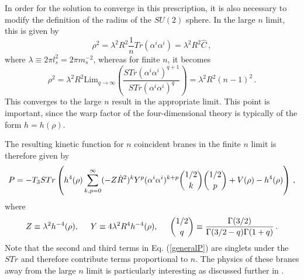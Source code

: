 In order for the solution to converge in this prescription, 
it is also necessary to modify the definition of the radius of the 
$SU(2)$ sphere. In the large $n$ limit, this is given by
\begin{equation}
\rho^2 = \lambda^2 R^2 \frac{1}{n} Tr(\alpha^i \alpha^i) = \lambda^2 R^2
\hat{C} \,,
\end{equation}
where $\lambda \equiv 2\pi l_s^2 = 2\pi m_s^{-2}$, 
whereas for finite $n$, it becomes
\begin{equation}
\rho^2 = \lambda^2 R^2 \mathrm{Lim}_{q \to \infty} \left(\frac{STr (\alpha^i
\alpha^i)^{q+1}}{STr(\alpha^i \alpha^i)^q} \right) 
= \lambda^2 R^2 (n-1)^2 \,.
\end{equation}
This converges to the large $n$ result in the appropriate limit.
This point is important, since the warp factor 
of the four-dimensional theory is typically of the form $h= h(\rho)$.

The resulting kinetic function for $n$ coincident branes in 
the finite $n$ limit is therefore given by
\begin{equation}
\label{generalP}
P = -T_3 STr \left(h^4(\rho) \sum_{k,p=0}^{\infty}(-Z\dot{R}^2)^k Y^p (\alpha^i
\alpha^i)^{k+p}{1/2 \choose k} {1/2 \choose p} + V(\rho)
-
h^4(\rho) \right) \,,
\end{equation}
where 
\begin{equation}
Z \equiv \lambda^2 h^{-4}(\rho), \hspace{0.5cm} Y \equiv 4\lambda^2 R^4
h^{-4}(\rho),
\hspace{0.5cm} {1/2 \choose q}
\equiv \frac{\Gamma(3/2)}{\Gamma(3/2-q)\Gamma(1+q)} \,.
\end{equation}
Note that the second and third terms in Eq. (\ref{generalP}) 
are singlets under the $STr$ and therefore contribute terms proportional 
to $n$. The physics of these branes away from the large $n$ limit is particularly interesting as
discussed further
in \cite{thomasward, Ward:2007gs}.

